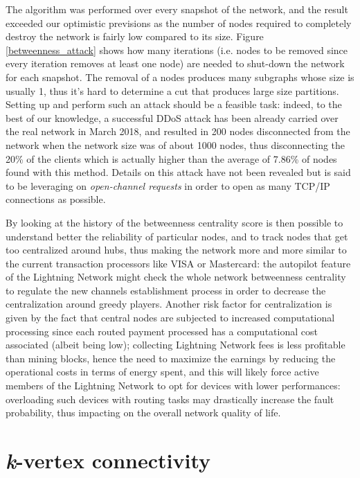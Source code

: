 	The algorithm was performed over every snapshot of the network, and the result exceeded our optimistic previsions as the number of nodes required to completely destroy the network is fairly low compared to its size. Figure \ref{betweenness_attack} shows	how many iterations (i.e. nodes to be removed since every iteration removes at least one node) are needed to shut-down the network for each snapshot. The removal of a nodes produces many subgraphs whose size is usually 1, thus it's hard to determine a cut that produces large size partitions. Setting up and perform such an attack should be a feasible task: indeed, to the best of our knowledge, a successful DDoS attack has been already carried over the real network in March 2018, and resulted in 200 nodes disconnected from the network when the network size was of about 1000 nodes, thus disconnecting the 20\% of the clients which is actually higher than the average of 7.86\% of nodes found with this method. Details on this attack have not been revealed but is said to be leveraging on \textit{open-channel requests} in order to open as many TCP/IP connections as possible.
	
	By looking at the history of the betweenness centrality score is then possible to understand better the reliability of particular nodes, and to track nodes that get too centralized around hubs, thus making the network more and more similar to the current transaction processors like VISA or Mastercard: the autopilot feature of the Lightning Network might check the whole network betweenness centrality to regulate the new channels establishment process in order to decrease the centralization around greedy players. Another risk factor for centralization is given by the fact that central nodes are subjected to increased computational processing since each routed payment processed has a computational cost associated (albeit being low); collecting Lightning Network fees is less profitable than mining blocks, hence the need to maximize the earnings by reducing the operational costs in terms of energy spent, and this will likely force active members of the Lightning Network to opt for devices with lower performances: overloading such devices with routing tasks may drastically increase the fault probability, thus impacting on the overall network quality of life.
	
	\section{\textit{k}-vertex connectivity}

